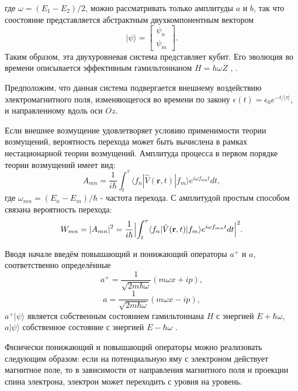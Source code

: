 \documentclass[14pt,a4paper]{PhDthesis}
\begin{document}
где $\omega = (E_{1} - E_{2})/2$, можно рассматривать только амплитуды $a$ и $b$, так что соостояние представляется абстрактным двухкомпонентным вектором
\begin{equation}
|\psi\rangle = \begin{bmatrix} \psi_{n} \\ \psi_{m} \end{bmatrix}.
\end{equation}
Таким образом, эта двухуровневая система представляет кубит. Его эволюция во времени описывается эффективным гамильтонианом $H = h \omega Z$ \cite{Vontsovskiy:1983ru}, \cite{JaySau:2010}.

Предположим, что данная система подвергается внешнему воздействию электромагнитного поля, изменяющегося во времени по закону 
$\epsilon (t) = \epsilon _{0} e^{-t/|\tau|}$, и направленному вдоль оси $Oz$. 

Если внешнее возмущение удовлетворяет условию применимости теории возмущений, вероятность перехода может быть вычислена в рамках нестационарной теории возмущений. Амплитуда процесса в первом порядке теории возмущений имеет вид: 
\begin{equation}
A_{mn} = \frac{1}{i \hbar} \int_{t}^{\tau} \langle f_{n}  |\hat{V}(\textbf{r}, t)|f_{m}\rangle e^{i \omega f_{mn} t} dt,
\end{equation}
где $\omega_{mn} = (E_{n} - E_{m})/\hbar$ - частота перехода. С амплитудой простым способом связана вероятность перехода:
\begin{equation}
W_{mn} = | A_{mn}|^{2} = \frac{1}{i \hbar} \Bigl |\int_{t}^{\tau} \langle f_{n}  |\hat{V}(\textbf{r}, t)|f_{m}\rangle e^{i \omega f_{mn} t} dt \Bigr |^{2}.
\end{equation}

Вводя начале введём повышающий и понижающий операторы $a^{+}$ и $a$,  соответственно определённые
\begin{equation}
a^{+} = \frac{1}{\sqrt{2m \hbar \omega}} (m \omega x + ip),
\end{equation}
\begin{equation}
a = \frac{1}{\sqrt{2m \hbar \omega}} (m \omega x - ip),
\end{equation}
$a^{+}|\psi\rangle$ является собственным состоянием гамильтониана $H$ с энергией $E + \hbar\omega$, $a|\psi\rangle$ собственное состояние с энергией  $E - \hbar\omega$ \cite{Nilsen:2001ru}.

Физически понижающий и повышающий операторы можно реализовать следующим образом: если на потенциальную яму с электроном действует магнитное поле, то в зависимости от направления магнитного поля и проекции спина электрона, электрон может переходить с уровня на уровень.
\end{document}
